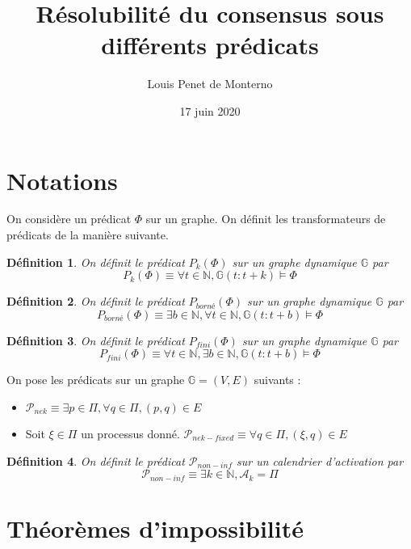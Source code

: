 \documentclass{article}
\title{Résolubilité du consensus sous différents prédicats}
\date{17 juin 2020}
\author{Louis Penet de Monterno}
\newtheorem{definition}{Définition}
\begin{document}
\maketitle

\section{Notations}

On considère un prédicat $\Phi$ sur un graphe. On définit les transformateurs de prédicats de la manière suivante.

\begin{definition}
	On définit le prédicat $P_k(\Phi)$ sur un graphe dynamique
	$\mathds{G}$ par $$P_k(\Phi) \equiv \forall t \in \mathds{N}, \mathds{G}(t:t+k) \models \Phi$$
\end{definition}
\begin{definition}
	On définit le prédicat $P_{borné}(\Phi)$ sur un graphe dynamique
	$\mathds{G}$ par $$P_{borné}(\Phi) \equiv \exists b \in \mathds{N}, \forall t \in \mathds{N}, \mathds{G}(t:t+b) \models \Phi$$
\end{definition}
\begin{definition}
	On définit le prédicat $P_{fini}(\Phi)$ sur un graphe dynamique
	$\mathds{G}$ par $$P_{fini}(\Phi) \equiv  \forall t \in \mathds{N}, \exists b \in \mathds{N}, \mathds{G}(t:t+b) \models \Phi$$
\end{definition}

On pose les prédicats sur un graphe $\mathds{G} = (V, E)$ suivants :
\begin{itemize}

	\item $\mathcal{P}_{nek} \equiv \exists p \in \Pi, \forall q \in \Pi, (p, q) \in E$
	\item Soit $\xi \in \Pi$ un processus donné. $\mathcal{P}_{nek-fixed} \equiv \forall q \in \Pi, (\xi, q) \in E$

\end{itemize}

\begin{definition}
	On définit le prédicat $\mathcal{P}_{non-inf}$ sur un calendrier d'activation par 
	$$\mathcal{P}_{non-inf} \equiv \exists k \in \mathds{N}, \mathcal{A}_k = \Pi$$
\end{definition}

\section{Théorèmes d'impossibilité}
\end{document}
